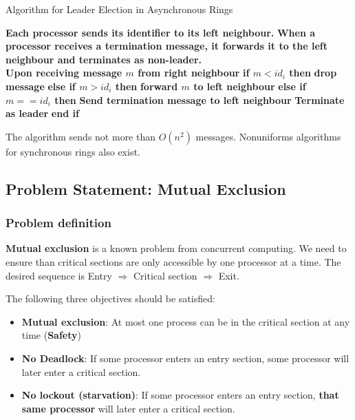 \documentclass[12pt,A4]{extarticle}
\begin{document}
\begin{algorithm}
  \caption{Algorithm for Leader Election in Asynchronous Rings}
  \begin{algorithmic}
    \State \textbf{Each processor sends its identifier to its left neighbour.}
    \State \textbf{When a processor receives a termination message, it forwards it to the left neighbour and terminates as non-leader.}\\
    \State \textbf{Upon receiving message $m$ from right neighbour}
    \State \hspace{\algorithmicindent} \textbf{if $m < id_i$ then}
    \State  \hspace{\algorithmicindent}\hspace{\algorithmicindent} \textbf{drop message}
    \State \hspace{\algorithmicindent} \textbf{else if $m > id_i$ then}
    \State  \hspace{\algorithmicindent}\hspace{\algorithmicindent} \textbf{forward $m$ to left neighbour}
    \State \hspace{\algorithmicindent} \textbf{else if $m == id_i$ then}
    \State  \hspace{\algorithmicindent}\hspace{\algorithmicindent} \textbf{Send termination message to left neighbour}
    \State  \hspace{\algorithmicindent}\hspace{\algorithmicindent} \textbf{Terminate as leader}
    \State \hspace{\algorithmicindent} \textbf{end if}
  \end{algorithmic}
\end{algorithm}

The algorithm sends not more than $O(n^2)$ messages. Nonuniforms algorithms for synchronous rings also exist.

\subsection{Problem Statement: Mutual Exclusion}
\subsubsection{Problem definition}
\textbf{Mutual exclusion} is a known problem from concurrent computing. We need to ensure than critical sections are only accessible by one processor at a time. The desired sequence is Entry $\Rightarrow$ Critical section $\Rightarrow$ Exit.\par
The following three objectives should be satisfied:
\begin{itemize}
  \item{\textbf{Mutual exclusion}: At most one process can be in the critical section at any time (\textbf{Safety})}
  \item{\textbf{No Deadlock}: If some processor enters an entry section, some processor will later enter a critical section.}
  \item{\textbf{No lockout (starvation)}: If some processor enters an entry section, \textbf{that same processor} will later enter a critical section.}
\end{itemize}
\end{document}
